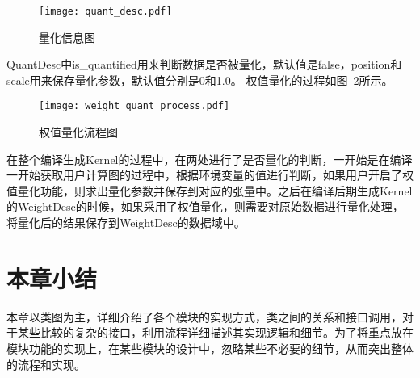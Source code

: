 \begin{figure}[htb]
  \centering
  \texttt{[image: quant\_desc.pdf]}
  \caption{量化信息图}
  \label{fig:quant-desc}
\end{figure}

QuantDesc中is\_quantified用来判断数据是否被量化，默认值是false，position和scale用来保存量化参数，默认值分别是0和1.0。
权值量化的过程如图~\ref{fig:weight-quant-process}所示。

\begin{figure}[htb]
  \centering
  \texttt{[image: weight\_quant\_process.pdf]}
  \caption{权值量化流程图}
  \label{fig:weight-quant-process}
\end{figure}

在整个编译生成Kernel的过程中，在两处进行了是否量化的判断，一开始是在编译一开始获取用户计算图的过程中，根据环境变量的值进行判断，如果用户开启了权值量化功能，则求出量化参数并保存到对应的张量中。之后在编译后期生成Kernel的WeightDesc的时候，如果采用了权值量化，则需要对原始数据进行量化处理，将量化后的结果保存到WeightDesc的数据域中。

\section {本章小结}

本章以类图为主，详细介绍了各个模块的实现方式，类之间的关系和接口调用，对于某些比较的复杂的接口，利用流程详细描述其实现逻辑和细节。为了将重点放在模块功能的实现上，在某些模块的设计中，忽略某些不必要的细节，从而突出整体的流程和实现。